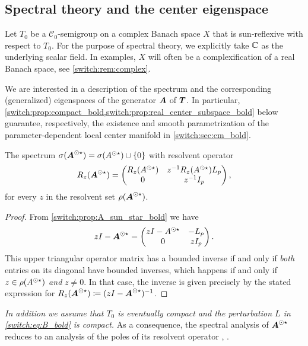 \subsection{Spectral theory and the center eigenspace}\label{switch:sec:spectral_bold}
Let $T_0$ be a $\mathcal{C}_0$-semigroup on a complex Banach space $X$ that is sun-reflexive with respect to $T_0$. For the purpose of spectral theory, we explicitly take $\mathbb{C}$ as the underlying scalar field. In examples, $X$ will often be a complexification of a real Banach space, see \cref{switch:rem:complex}.

We are interested in a description of the spectrum and the corresponding (generalized) eigenspaces of the generator $\boldsymbol{A}$ of $\boldsymbol{T}$. In particular, \cref{switch:prop:compact_bold,switch:prop:real_center_subspace_bold} below guarantee, respectively, the existence and smooth parametrization of the parameter-dependent local center manifold in \cref{switch:sec:cm_bold}. 

\begin{proposition}\label{switch:prop:spectrum_bold}
  The spectrum $\sigma(\boldsymbol{A}^{\odot\star}) = \sigma(A^{\odot\star}) \cup \{0\}$ with resolvent operator
   \begin{equation}
    \label{switch:eq:resolvent_bold}
    R_z(\boldsymbol{A}^{\odot\star}) =
    \begin{pmatrix}
      R_z(A^{\odot\star})& z^{-1}R_z(A^{\odot\star})L_p\\
      0 & z^{-1}I_p
    \end{pmatrix},
  \end{equation}
  for every $z$ in the resolvent set $\rho(\boldsymbol{A}^{\odot\star})$.
\end{proposition}
\begin{proof}
  From \cref{switch:prop:A_sun_star_bold} we have
  \[
    z I - \boldsymbol{A}^{\odot\star} =
    \begin{pmatrix}
      z I - A^{\odot\star}& -L_p\\
      0& z I_p
    \end{pmatrix}.
  \]
  This upper triangular operator matrix has a bounded inverse if and only if \emph{both} entries on its diagonal have bounded inverses, which happens if and only if $z \in \rho(A^{\odot\star})$ \emph{and} $z \neq 0$. In that case, the inverse is given precisely by the stated expression for $R_z(\boldsymbol{A}^{\odot\star}) \coloneqq (z I - \boldsymbol{A}^{\odot\star})^{-1}$.
\end{proof}

\emph{In addition we assume that $T_0$ is eventually compact and the perturbation $L$ in \cref{switch:eq:B_bold} is compact.} As a consequence, the spectral analysis of $\boldsymbol{A}^{\odot\star}$ reduces to an analysis of the poles of its resolvent operator \cite[Corollary V.3.2]{Engel2000}, \cite[Section V.10]{Taylor1980}.

